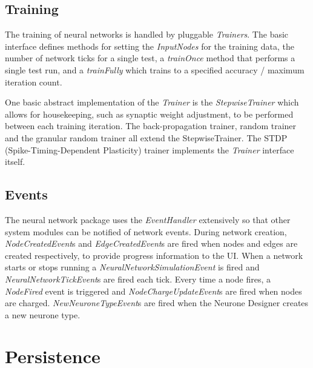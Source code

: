 \documentclass{acm_proc_article-sp}
\begin{document}
\subsection{Training}
{
The training of neural networks is handled by pluggable {\textit{Trainers}}. The basic interface defines methods for setting the {\textit{InputNodes}} for the training data, the number of network ticks for a single test, a {\textit{trainOnce}} method that performs a single test run, and a {\textit{trainFully}} which trains to a specified accuracy / maximum iteration count.

One basic abstract implementation of the {\textit{Trainer}} is the {\textit{StepwiseTrainer}} which allows for housekeeping, such as synaptic weight adjustment, to be performed between each training iteration. The back-propagation trainer, random trainer and the granular random trainer all extend the StepwiseTrainer. The STDP (Spike{}-Timing{}-Dependent Plasticity) trainer implements the {\textit{Trainer}} interface itself.
}
\subsection{Events}
{
The neural network package uses the {\textit{EventHandler}} extensively so that other system modules can be notified of network events. During network creation, {\textit{NodeCreatedEvent}}s and {\textit{EdgeCreatedEvent}}s are fired when nodes and edges are created respectively, to provide progress information to the UI. When a network starts or stops running a {\textit{NeuralNetworkSimulationEvent}} is fired and {\textit{NeuralNetworkTickEvent}}s are fired each tick. Every time a node fires, a {\textit{NodeFired}} event is triggered and {\textit{NodeChargeUpdateEvent}}s are fired when nodes are charged. {\textit{NewNeuroneTypeEvent}}s are fired when the Neurone Designer creates a new neurone type. 
}

\section{Persistence}
\end{document}
